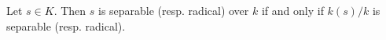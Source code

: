 Let $s \in K$. Then $s$ is separable (resp. radical) over $k$ if and only if $k(s)/k$ is separable (resp. radical).
